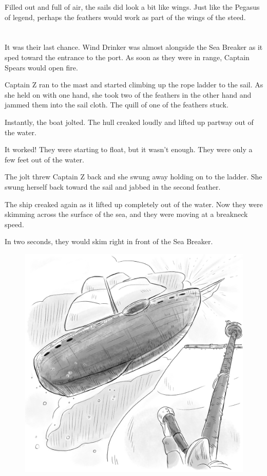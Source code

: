 \documentclass[12pt]{extbook}
\begin{document}
  Filled out and full of air, the sails did look a bit like wings. Just
  like the Pegasus of legend, perhaps the feathers would work as part of
  the wings of the steed.
  
  \section{}\label{section-43}
  
  It was their last chance. Wind Drinker was almost alongside the Sea
  Breaker as it sped toward the entrance to the port. As soon as they were
  in range, Captain Spears would open fire.
  
  Captain Z ran to the mast and started climbing up the rope ladder to the
  sail. As she held on with one hand, she took two of the feathers in the
  other hand and jammed them into the sail cloth. The quill of one of the
  feathers stuck.
  
  Instantly, the boat jolted. The hull creaked loudly and lifted up
  partway out of the water.
  
  It worked! They were starting to float, but it wasn't enough. They were
  only a few feet out of the water.
  
  The jolt threw Captain Z back and she swung away holding on to the
  ladder. She swung herself back toward the sail and jabbed in the second
  feather.
  
  The ship creaked again as it lifted up completely out of the water. Now
  they were skimming across the surface of the sea, and they were moving
  at a breakneck speed.
  
  In two seconds, they would skim right in front of the Sea Breaker.
  
  \begin{figure}[htbp]
  \centering
  \includegraphics{img/flying_ship.png}
  \caption{}
  \end{figure}
  
\end{document}
